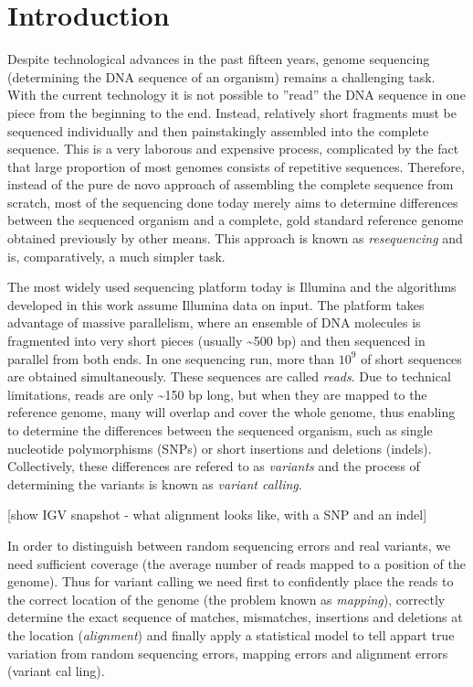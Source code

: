 \chapter{Introduction}
\label{chap:introduction}

Despite technological advances in the past fifteen years, genome sequencing (determining the DNA sequence of an organism) remains a challenging task. With the current technology it is not possible to ”read” the DNA sequence in one
piece from the beginning to the end. Instead, relatively short fragments must
be sequenced individually and then painstakingly assembled into the complete
sequence. This is a very laborous and expensive process, complicated by the fact
that large proportion of most genomes consists of repetitive sequences. Therefore,
instead of the pure de novo approach of assembling the complete sequence from
scratch, most of the sequencing done today merely aims to determine differences
between the sequenced organism and a complete, gold standard reference genome obtained previously by other means. This approach is known as \textit{resequencing} and is, comparatively, a much simpler task.

The most widely used sequencing platform today is Illumina and the algorithms developed in this work assume Illumina data on input. The platform takes advantage of massive parallelism, where an ensemble of DNA molecules is fragmented into very short pieces (usually \textasciitilde 500 bp) and then sequenced in parallel from both ends. In one sequencing run, more than $10^9$ of short sequences are obtained simultaneously. These sequences are called \textit{reads}. Due to technical limitations, reads are only \textasciitilde 150 bp long, but when they are mapped to the reference genome, many will overlap and cover the whole genome, thus enabling to determine the differences between the sequenced organism, such as single nucleotide polymorphisms (SNPs) or short insertions and deletions (indels). Collectively, these differences are refered to as \textit{variants} and the process of determining the variants is known as \textit{variant calling}.

[show IGV snapshot - what alignment looks like, with a SNP and an indel]

In order to distinguish between random sequencing errors and real variants, we need sufficient coverage (the average number of reads mapped to a position of
the genome). Thus for variant calling we need first to confidently place the reads
to the correct location of the genome (the problem known as \textit{mapping}), correctly determine the exact sequence of matches, mismatches, insertions and deletions at the location (\textit{alignment}) and finally apply a statistical model to tell appart true variation from random sequencing errors, mapping errors and alignment errors (variant cal ling).

